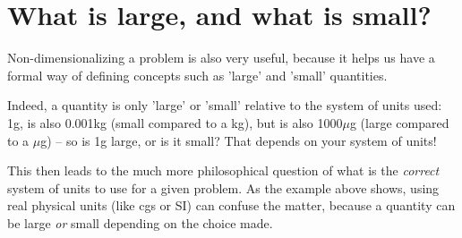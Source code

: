 \section{What is large, and what is small?}

Non-dimensionalizing a problem is also very useful, because it helps us have a formal way of defining concepts such as 'large' and 'small' quantities. 

Indeed, a quantity is only 'large' or 'small' relative to the system of units used: 1g, is also 0.001kg (small compared to a kg), but is also 1000$\mu$g (large compared to a $\mu$g) -- so is 1g large, or is it small? That depends on your system of units!  

This then leads to the much more philosophical question of what is the {\it correct} system of units to use for a given problem. As the example above shows, using real physical units (like cgs or SI) can confuse the matter, because a quantity can be large {\it or} small depending on the choice made. 

